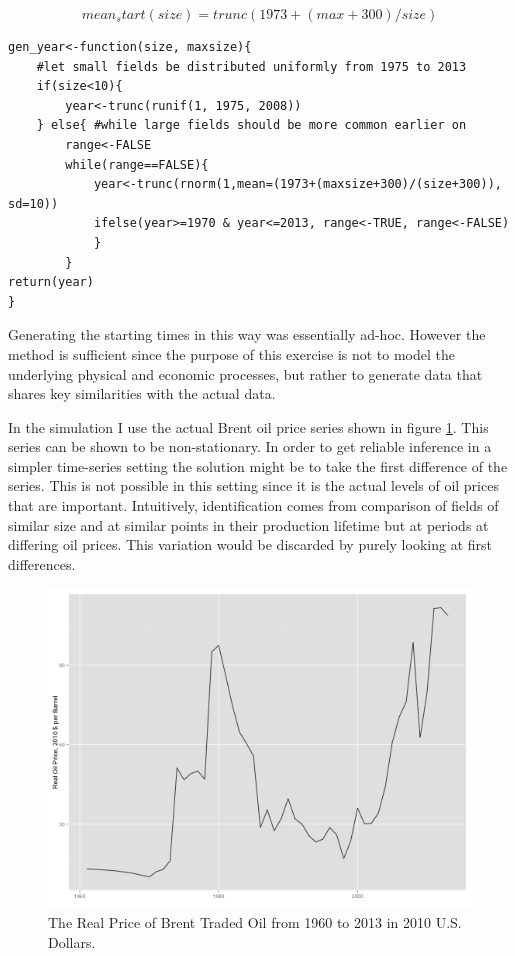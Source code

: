 \documentclass[12pt]{article}
\begin{document}
\begin{equation}
mean_start(size) = trunc(1973 + (max + 300)/size)
\end{equation}

\begin{verbatim}
gen_year<-function(size, maxsize){
	#let small fields be distributed uniformly from 1975 to 2013
	if(size<10){
		year<-trunc(runif(1, 1975, 2008))	
	} else{	#while large fields should be more common earlier on
		range<-FALSE
		while(range==FALSE){
			year<-trunc(rnorm(1,mean=(1973+(maxsize+300)/(size+300)), sd=10))
			ifelse(year>=1970 & year<=2013, range<-TRUE, range<-FALSE)
			}	
		}
return(year)	
}
\end{verbatim}

Generating the starting times in this way was essentially ad-hoc.  However the method is sufficient since the purpose of this exercise is not to model the underlying physical and economic processes, but rather to generate data that shares key similarities with the actual data.

In the simulation I use the actual Brent oil price series shown in figure \ref{oil_price_series}.  This series can be shown to be non-stationary.  In order to get reliable inference in a simpler time-series setting the solution might be to take the first difference of the series.  This is not possible in this setting since it is the actual levels of oil prices that are important.  Intuitively, identification comes from comparison of fields of similar size and at similar points in their production lifetime but at periods at differing oil prices.  This variation would be discarded by purely looking at first differences.

\begin{figure}
	\includegraphics[width=1\textwidth]{figures/oil_price_series.png}
	\caption{The Real Price of Brent Traded Oil from 1960 to 2013 in 2010 U.S. Dollars.}
	\label{oil_price_series}	
\end{figure}
\end{document}
